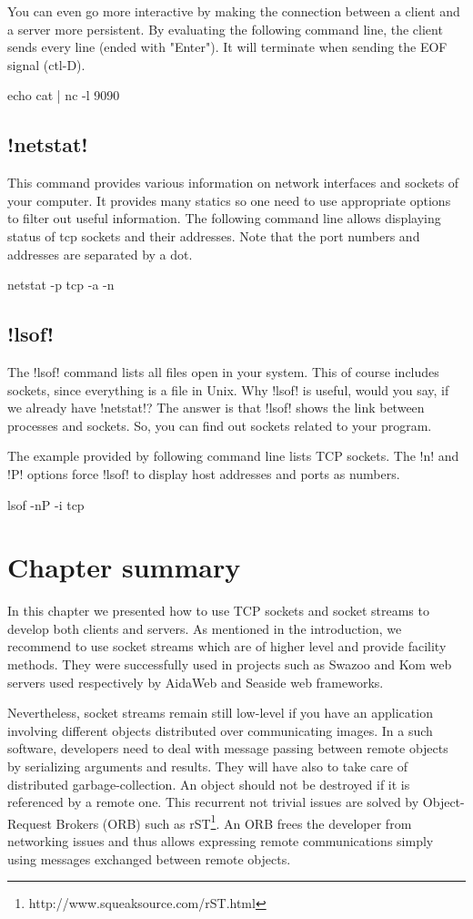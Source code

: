 \documentclass[a4paper,10pt,twoside]{book}
\begin{document}
You can even go more interactive by making the connection between a client and a server more persistent.
By evaluating the following command line, the client sends every line (ended with "Enter").
It will terminate when sending the EOF signal (ctl-D).
\begin{code}{}
echo cat | nc -l 9090 
\end{code}


\subsection{\ct!netstat!}
This command provides various information on network interfaces and sockets of your computer.
It provides many statics so one need to use appropriate options to filter out useful information.
The following command line allows displaying status of tcp sockets and their addresses.
Note that the port numbers and addresses are separated by a dot.
\begin{code}{}
netstat -p tcp -a -n
\end{code}
 
\subsection{\ct!lsof!}
The \ct!lsof! command lists all files open in your system.
This of course includes sockets, since everything is a file in Unix.
Why \ct!lsof! is useful, would you say, if we already have \ct!netstat!?
The answer is that \ct!lsof! shows the link between processes and sockets.
So, you can find out sockets related to your program.

The example provided by following command line lists TCP sockets.
The \ct!n! and \ct!P! options force \ct!lsof! to display host addresses and ports as numbers. 
\begin{code}{}
lsof -nP -i tcp
\end{code}


\section{Chapter summary}
In this chapter we presented how to use TCP sockets and socket streams to develop both clients and servers.
As mentioned in the introduction, we recommend to use socket streams which are of higher level and provide facility methods.
They were successfully used in projects such as Swazoo and Kom web servers used respectively by AidaWeb and Seaside web frameworks.

Nevertheless, socket streams remain still low-level if you have an application involving different objects distributed over communicating images.
In a such software, developers need to deal with message passing between remote objects by serializing arguments and results.
They will have also to take care of distributed garbage-collection.
An object should not be destroyed if it is referenced by a remote one.
This recurrent not trivial issues are solved by Object-Request Brokers (ORB) such as rST\footnote{http://www.squeaksource.com/rST.html}.
An ORB frees the developer from networking issues and thus allows expressing remote communications simply using messages exchanged between remote objects.
\end{document}
